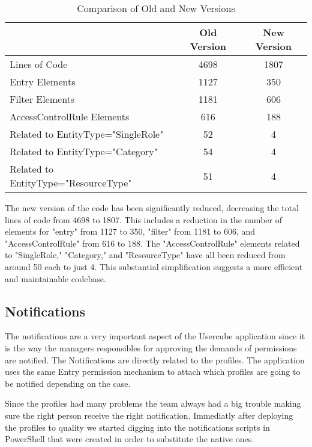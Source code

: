 \begin{table}[h]
    \centering
    \begin{tabular}{lcc}
        \toprule
        & \textbf{Old Version} & \textbf{New Version} \\
        \midrule
        Lines of Code & 4698 & 1807 \\
        \midrule
        Entry Elements & 1127 & 350 \\
        Filter Elements & 1181 & 606 \\
        AccessControlRule Elements & 616 & 188 \\
        \quad Related to EntityType="SingleRole" & 52 & 4 \\
        \quad Related to EntityType="Category" & 54 & 4 \\
        \quad Related to EntityType="ResourceType" & 51 & 4 \\
        \bottomrule
    \end{tabular}
    \caption{Comparison of Old and New Versions}
    \label{tab:comparison}
\end{table}

The new version of the code has been significantly reduced, decreasing the total lines of code from 4698 to 1807. This includes a reduction in the number of elements for "entry" from 1127 to 350, "filter" from 1181 to 606, and "AccessControlRule" from 616 to 188. The "AccessControlRule" elements related to "SingleRole," "Category," and "ResourceType" have all been reduced from around 50 each to just 4. This substantial simplification suggests a more efficient and maintainable codebase.

\subsection{Notifications}

The notifications are a very important aspect of the Usercube application since it is the way the managers responsibles for approving the demands of permissions are notified. The Notifications are directly related to the profiles. The application uses the same Entry permission mechanism to attach which profiles are going to be notified depending on the case.

Since the profiles had many problems the team always had a big trouble making sure the right person receive the right notification. Immediatly after deploying the profiles to quality we started digging into the notifications scripts in PowerShell that were created in order to substitute the native ones.



